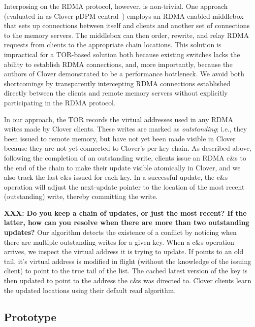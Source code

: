 Interposing on the RDMA protocol, however, is non-trivial. One
approach (evaluated in as Clover pDPM-central~\cite{clover}) employs
an RDMA-enabled middlebox that sets up connections between itself and
clients and another set of connections to the memory servers.  The
middlebox can then order, rewrite, and relay RDMA requests from
clients to the appropriate chain locations. This solution is
impractical for a TOR-based solution both because existing switches
lacks the ability to establish RDMA connections, and, more
importantly, because the authors of Clover demonstrated to be a
performance bottleneck.  We avoid both shortcomings by transparently
intercepting RDMA connections established directly between the clients
and remote memory servers without explicitly participating in the RDMA
protocol.

In our approach, the TOR records the virtual addresses used in any
RDMA writes made by Clover clients. These writes are marked as
\textit{outstanding}; i.e., they been issued to remote memory, but
have not yet been made visible in Clover because they are not yet
connected to Clover's per-key chain.  As described above, following
the completion of an outstanding write, clients issue an RDMA c\&s to
the end of the chain to make their update visible atomically in Clover,
and we also track the last c\&s issued for each key.  In a successful
update, the c\&s operation will adjust the next-update pointer to the
location of the most recent (outstanding) write, thereby committing the
write.

\textbf{XXX: Do you keep a chain of updates, or just the most recent?
  If the latter, how can you resolve when there are more than two
  outstanding updates?}  Our algorithm detects the existence of a
conflict by noticing when there are multiple outstanding writes for a
given key. When a c\&s operation arrives, we inspect the virtual
address it is trying to update.  If points to an old tail, it's
virtual address is modified in flight (without the knowledge of the
issuing client) to point to the true tail of the list. The cached
latest version of the key is then updated to point to the address the
c\&s was directed to.  Clover clients learn the updated locations
using their default read algorithm.

\subsection{Prototype}

